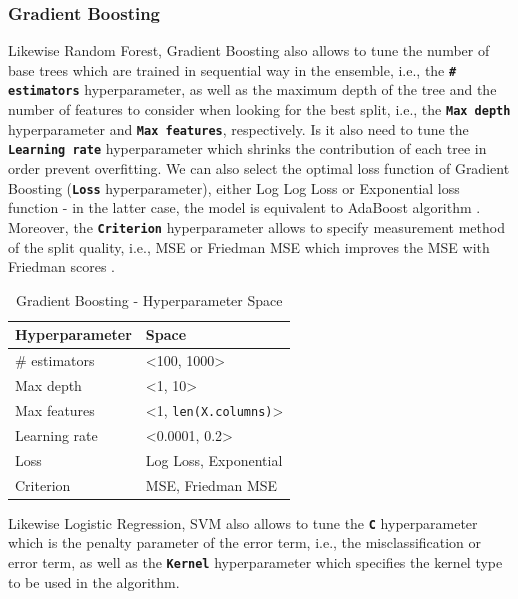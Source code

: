 \subsubsection{Gradient Boosting}
Likewise Random Forest, Gradient Boosting also allows to tune the number of base trees which are trained in sequential way in the ensemble, i.e., the \textbf{\texttt{\# estimators}} hyperparameter, as well as the maximum depth of the tree and the number of features to consider when looking for the best split, i.e., the \textbf{\texttt{Max depth}} hyperparameter and \textbf{\texttt{Max features}}, respectively.
Is it also need to tune the \textbf{\texttt{Learning rate}} hyperparameter which shrinks the contribution of each tree in order prevent overfitting.
We can also select the optimal loss function of Gradient Boosting (\textbf{\texttt{Loss}} hyperparameter), either Log Log Loss or Exponential loss function - in the latter case, the model is equivalent to AdaBoost algorithm \citep{scikit-gb}.
Moreover, the \textbf{\texttt{Criterion}} hyperparameter allows to specify measurement method of the split quality, i.e., MSE or Friedman MSE which improves the MSE with Friedman scores \citep{scikit-gb}.

\begin{table}[H]
\small
\setlength{\tabcolsep}{8pt}
\renewcommand{\arraystretch}{1.3}
\centering
    \caption[Gradient Boosting - Hyperparameter Space]{Gradient Boosting - Hyperparameter Space}\label{tab:gbspace}
    \begin{tabular}{ll}
\toprule
\textbf{Hyperparameter} & \textbf{Space}\\
\midrule
\hline
\# estimators & <100, 1000> \\
Max depth & <1, 10> \\
Max features & <1, \verb|len(X.columns)|>  \\
Learning rate & <0.0001, 0.2> \\
Loss & Log Loss, Exponential \\
Criterion & MSE, Friedman MSE \\
\hline
\bottomrule
\end{tabular}
\vspace{0.7em}

\vspace{-1em}
\end{table}

Likewise Logistic Regression, SVM also allows to tune the \textbf{\texttt{C}} hyperparameter which is the penalty parameter of the error term, i.e., the misclassification or error term, as well as the \textbf{\texttt{Kernel}} hyperparameter which specifies the kernel type to be used in the algorithm.

